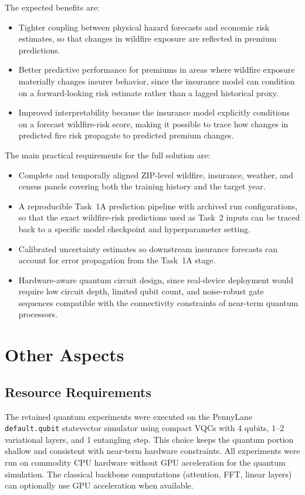 \documentclass[11pt]{article}
\begin{document}
The expected benefits are:
\begin{itemize}
  \item Tighter coupling between physical hazard forecasts and economic risk estimates, so that changes in wildfire exposure are reflected in premium predictions.
  \item Better predictive performance for premiums in areas where wildfire exposure materially changes insurer behavior, since the insurance model can condition on a forward-looking risk estimate rather than a lagged historical proxy.
  \item Improved interpretability because the insurance model explicitly conditions on a forecast wildfire-risk score, making it possible to trace how changes in predicted fire risk propagate to predicted premium changes.
\end{itemize}

The main practical requirements for the full solution are:
\begin{itemize}
  \item Complete and temporally aligned ZIP-level wildfire, insurance, weather, and census panels covering both the training history and the target year.
  \item A reproducible Task~1A prediction pipeline with archived run configurations, so that the exact wildfire-risk predictions used as Task~2 inputs can be traced back to a specific model checkpoint and hyperparameter setting.
  \item Calibrated uncertainty estimates so downstream insurance forecasts can account for error propagation from the Task~1A stage.
  \item Hardware-aware quantum circuit design, since real-device deployment would require low circuit depth, limited qubit count, and noise-robust gate sequences compatible with the connectivity constraints of near-term quantum processors.
\end{itemize}

\section{Other Aspects}

\subsection*{Resource Requirements}

The retained quantum experiments were executed on the PennyLane \texttt{default.qubit} statevector simulator using compact VQCs with 4 qubits, 1--2 variational layers, and 1 entangling step. This choice keeps the quantum portion shallow and consistent with near-term hardware constraints. All experiments were run on commodity CPU hardware without GPU acceleration for the quantum simulation. The classical backbone computations (attention, FFT, linear layers) can optionally use GPU acceleration when available.
\end{document}
